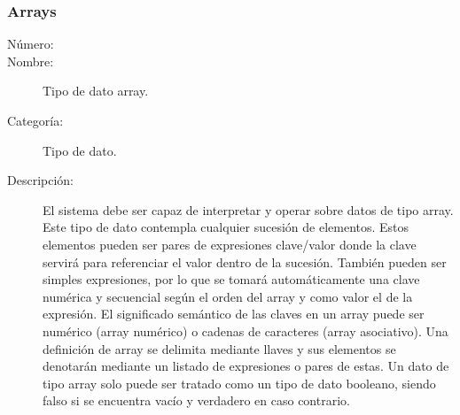 \subsubsection{Arrays}
	\begin{description}
		\item [Número:] \cn
		\item [Nombre:] Tipo de dato array.
		\item [Categoría:] Tipo de dato.
		\item [Descripción:] El sistema debe ser capaz de interpretar y operar sobre datos de tipo array. Este tipo
		de dato contempla cualquier sucesión de elementos. Estos elementos pueden ser pares de expresiones clave/valor donde la clave servirá
		para referenciar el valor dentro de la sucesión. También pueden ser simples expresiones, por lo que se tomará automáticamente una clave
		numérica y secuencial según el orden del array y como valor el de la expresión. El significado semántico de las claves en un array puede
		ser numérico (array numérico) o cadenas de caracteres (array asociativo).  
		Una definición de array se delimita mediante llaves y sus elementos se denotarán mediante un listado de expresiones o pares de estas. Un dato de tipo array solo puede ser tratado como un tipo de dato booleano,
		siendo falso si se encuentra vacío y verdadero en caso contrario.
	\end {description}
